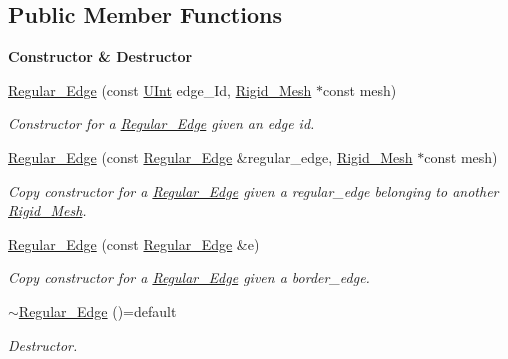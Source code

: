 \subsection*{Public Member Functions}
\begin{Indent}{\bf Constructor \& Destructor}\par
\begin{DoxyCompactItemize}
\item 
\hyperlink{classFVCode3D_1_1Rigid__Mesh_1_1Regular__Edge_a92a9212ce948a5151320a4a29be3218d}{Regular\+\_\+\+Edge} (const \hyperlink{namespaceFVCode3D_a4bf7e328c75d0fd504050d040ebe9eda}{U\+Int} edge\+\_\+\+Id, \hyperlink{classFVCode3D_1_1Rigid__Mesh}{Rigid\+\_\+\+Mesh} $\ast$const mesh)
\begin{DoxyCompactList}\small\item\em Constructor for a \hyperlink{classFVCode3D_1_1Rigid__Mesh_1_1Regular__Edge}{Regular\+\_\+\+Edge} given an edge id. \end{DoxyCompactList}\item 
\hyperlink{classFVCode3D_1_1Rigid__Mesh_1_1Regular__Edge_a2b0ad2082f68fbfa1bc9c65cc0b41d30}{Regular\+\_\+\+Edge} (const \hyperlink{classFVCode3D_1_1Rigid__Mesh_1_1Regular__Edge}{Regular\+\_\+\+Edge} \&regular\+\_\+edge, \hyperlink{classFVCode3D_1_1Rigid__Mesh}{Rigid\+\_\+\+Mesh} $\ast$const mesh)
\begin{DoxyCompactList}\small\item\em Copy constructor for a \hyperlink{classFVCode3D_1_1Rigid__Mesh_1_1Regular__Edge}{Regular\+\_\+\+Edge} given a regular\+\_\+edge belonging to another \hyperlink{classFVCode3D_1_1Rigid__Mesh}{Rigid\+\_\+\+Mesh}. \end{DoxyCompactList}\item 
\hyperlink{classFVCode3D_1_1Rigid__Mesh_1_1Regular__Edge_a95bc768eb796d743762452c898337f5f}{Regular\+\_\+\+Edge} (const \hyperlink{classFVCode3D_1_1Rigid__Mesh_1_1Regular__Edge}{Regular\+\_\+\+Edge} \&e)
\begin{DoxyCompactList}\small\item\em Copy constructor for a \hyperlink{classFVCode3D_1_1Rigid__Mesh_1_1Regular__Edge}{Regular\+\_\+\+Edge} given a border\+\_\+edge. \end{DoxyCompactList}\item 
\hyperlink{classFVCode3D_1_1Rigid__Mesh_1_1Regular__Edge_a83a219b6e62c0985b13e292738aae6b0}{$\sim$\+Regular\+\_\+\+Edge} ()=default
\begin{DoxyCompactList}\small\item\em Destructor. \end{DoxyCompactList}\end{DoxyCompactItemize}
\end{Indent}
